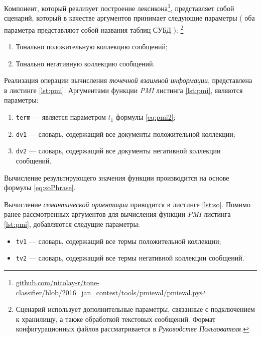     Компонент, который реализует построение лексикона\footnote{ \url{github.com/nicolay-r/tone-classifier/blob/2016_jan_contest/tools/pmieval/pmieval.py}},
    представляет собой сценарий, который в качестве аргументов принимает следующие
    параметры
    (
        оба параметра представляют собой названия таблиц СУБД
    ):
    \footnote{Сценарий использует дополнительные параметры, связанные
    с подключением к хранилищу, а также обработкой текстовых сообщений.
    Формат конфигурационных файлов рассматривается в {\it Руководстве
    Пользователя.}}

    \begin{enumerate}
        \item Тонально положительную коллекцию сообщений;
        \item Тонально негативную коллекцию сообщений.
    \end{enumerate}

    Реализация операции вычисления {\it точечной взаимной информации},
    представлена в листинге \ref{lst:pmi}.
    Аргументами функции {\it PMI} листинга \ref{lst:pmi}, являются параметры:
    \begin{enumerate}
        \item {\tt term} --- является параметром $t_1$
            формулы \ref{eq:pmi2};
        \item {\tt dv1} --- словарь, содержащий все документы положительной коллекции;
        \item {\tt dv2} --- словарь, содержащий все документы негативной коллекции сообщений.
    \end{enumerate}

    Вычисление результирующего значения функции производится на основе формулы \ref{eq:soPhrase}.

    \lstset{style=python}
    

    Вычисление {\it семантической ориентации} приводится в листинге \ref{lst:so}.
    Помимо ранее рассмотренных аргументов для вычисления функции {\it PMI}
    листинга \ref{lst:pmi}, добавляются следущие параметры:
    \begin{itemize}
        \item {\tt tv1} --- словарь, содержащий все термы положительной коллекции;
        \item {\tt tv2} --- словарь, содержащий все термы негативной коллекции сообщений.
    \end{itemize}

